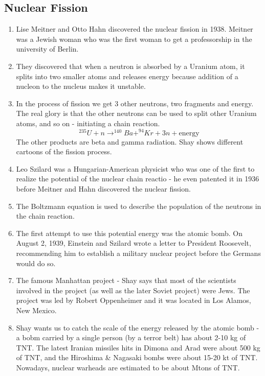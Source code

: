 \documentclass[11pt]{article}
\begin{document}
\subsection{Nuclear Fission}
\begin{enumerate}
    \item Lise Meitner and Otto Hahn discovered the nuclear fission in 1938. Meitner was a Jewish woman who was the first woman to get a professorship in the university of Berlin.
    \item They discovered that when a neutron is absorbed by a Uranium atom, it splits into two smaller atoms and releases energy because addition of a nucleon to the nucleus makes it unstable.
    \item In the process of fission we get 3 other neutrons, two fragments and energy. The real glory is that the other neutrons can be used to split other Uranium atoms, and so on - initiating a chain reaction.
    \begin{equation}
        ^{235}U + n \rightarrow ^{140}Ba + ^{94}Kr + 3n + \text{energy}
    \end{equation}
    The other products are beta and gamma radiation. Shay shows different cartoons of the fission process.
    \item Leo Szilard was a Hungarian-American physicist who was one of the first to realize the potential of the nuclear chain reactio - he even patented it in 1936 before Meitner and Hahn discovered the nuclear fission.
    \item The Boltzmann equation is used to describe the population of the neutrons in the chain reaction.
    \item The first attempt to use this potential energy was the atomic bomb. On August 2, 1939, Einstein and Szilard wrote a letter to President Roosevelt, recommending him to establish a military nuclear project before the Germans would do so.
    \item The famous Manhattan project - Shay says that most of the scientists involved in the project (as well as the later Soviet project) were Jews. The project was led by Robert Oppenheimer and it was located in Los Alamos, New Mexico.
    \item Shay wants us to catch the scale of the energy released by the atomic bomb - a bobm carried by a single person (by a terror belt) has about 2-10 kg of TNT. The latest Iranian missiles hits in Dimona and Arad were about 500 kg of TNT, and the Hiroshima \& Nagasaki bombs were about 15-20 kt of TNT. Nowadays, nuclear warheads are estimated to be about Mtons of TNT.
\end{enumerate}
\end{document}
